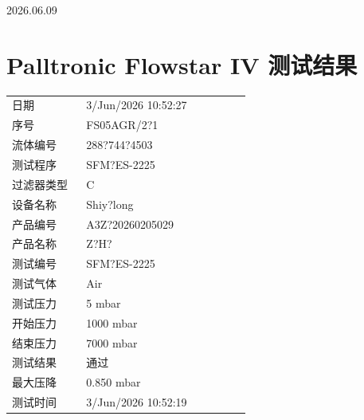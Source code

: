 \documentclass[UTF8,10pt,a4paper,fontset=fandol]{ctexart}
\newcommand{\fieldvalue}[1]{#1}
\newcommand{\handwritten}[1]{#1}
\begin{document}
\fieldvalue{\handwritten{2026.06.09}}

\newpage

\section*{Palltronic Flowstar IV 测试结果}

\begin{tabular}{@{}p{0.28\linewidth}p{0.62\linewidth}@{}}
日期 &
\fieldvalue{3/Jun/2026 10:52:27}
\\
序号 &
\fieldvalue{FS05AGR/2?1}
\\
流体编号 &
\fieldvalue{288?744?4503}
\\
测试程序 &
\fieldvalue{SFM?ES-2225}
\\
过滤器类型 &
\fieldvalue{C}
\\
设备名称 &
\fieldvalue{Shiy?long}
\\
产品编号 &
\fieldvalue{A3Z?20260205029}
\\
产品名称 &
\fieldvalue{Z?H?}
\\
测试编号 &
\fieldvalue{SFM?ES-2225}
\\
测试气体 &
\fieldvalue{Air}
\\
测试压力 &
\fieldvalue{5 mbar}
\\
开始压力 &
\fieldvalue{1000 mbar}
\\
结束压力 &
\fieldvalue{7000 mbar}
\\
测试结果 &
\fieldvalue{通过}
\\
最大压降 &
\fieldvalue{0.850 mbar}
\\
测试时间 &
\fieldvalue{3/Jun/2026 10:52:19}
\end{tabular}
\end{document}
